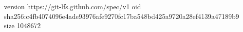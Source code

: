 version https://git-lfs.github.com/spec/v1
oid sha256:c4fb4074096e4ade93976afe9270fc17ba548bd425a9720a28ef4139a47189b9
size 1048672
